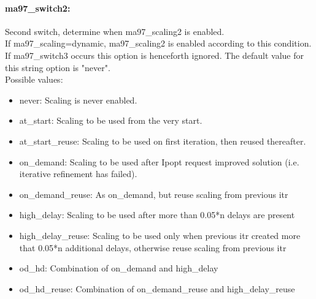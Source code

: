 \paragraph{ma97\_switch2:}\label{opt:ma97_switch2} Second switch, determine when ma97\_scaling2 is enabled. \\
 If ma97\_scaling=dynamic, ma97\_scaling2 is
enabled according to this condition. If
ma97\_switch3 occurs this option is henceforth
ignored. The default value for this string option is "never".
\\ 
Possible values:
\begin{itemize}
   \item never: Scaling is never enabled.
   \item at\_start: Scaling to be used from the very start.
   \item at\_start\_reuse: Scaling to be used on first iteration, then
reused thereafter.
   \item on\_demand: Scaling to be used after Ipopt request improved
solution (i.e. iterative refinement has failed).
   \item on\_demand\_reuse: As on\_demand, but reuse scaling from previous
itr
   \item high\_delay: Scaling to be used after more than 0.05*n
delays are present
   \item high\_delay\_reuse: Scaling to be used only when previous itr
created more that 0.05*n additional delays,
otherwise reuse scaling from previous itr
   \item od\_hd: Combination of on\_demand and high\_delay
   \item od\_hd\_reuse: Combination of on\_demand\_reuse and
high\_delay\_reuse
\end{itemize}

